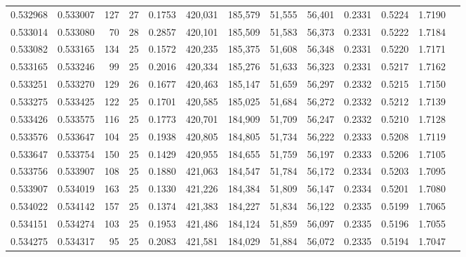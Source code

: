 \begin{tabular}{rrrrrrrrrrrrr}
0.532968 & 0.533007 & 127 &  27 &                                     0.1753 & 420,031 & 185,579 &  51,555 &  56,401 & 0.2331 & 0.5224 & 1.7190 \\
0.533014 & 0.533080 &  70 &  28 &                                     0.2857 & 420,101 & 185,509 &  51,583 &  56,373 & 0.2331 & 0.5222 & 1.7184 \\
0.533082 & 0.533165 & 134 &  25 &                                     0.1572 & 420,235 & 185,375 &  51,608 &  56,348 & 0.2331 & 0.5220 & 1.7171 \\
0.533165 & 0.533246 &  99 &  25 &                                     0.2016 & 420,334 & 185,276 &  51,633 &  56,323 & 0.2331 & 0.5217 & 1.7162 \\
0.533251 & 0.533270 & 129 &  26 &                                     0.1677 & 420,463 & 185,147 &  51,659 &  56,297 & 0.2332 & 0.5215 & 1.7150 \\
0.533275 & 0.533425 & 122 &  25 &                                     0.1701 & 420,585 & 185,025 &  51,684 &  56,272 & 0.2332 & 0.5212 & 1.7139 \\
0.533426 & 0.533575 & 116 &  25 &                                     0.1773 & 420,701 & 184,909 &  51,709 &  56,247 & 0.2332 & 0.5210 & 1.7128 \\
0.533576 & 0.533647 & 104 &  25 &                                     0.1938 & 420,805 & 184,805 &  51,734 &  56,222 & 0.2333 & 0.5208 & 1.7119 \\
0.533647 & 0.533754 & 150 &  25 &                                     0.1429 & 420,955 & 184,655 &  51,759 &  56,197 & 0.2333 & 0.5206 & 1.7105 \\
0.533756 & 0.533907 & 108 &  25 &                                     0.1880 & 421,063 & 184,547 &  51,784 &  56,172 & 0.2334 & 0.5203 & 1.7095 \\
0.533907 & 0.534019 & 163 &  25 &                                     0.1330 & 421,226 & 184,384 &  51,809 &  56,147 & 0.2334 & 0.5201 & 1.7080 \\
0.534022 & 0.534142 & 157 &  25 &                                     0.1374 & 421,383 & 184,227 &  51,834 &  56,122 & 0.2335 & 0.5199 & 1.7065 \\
0.534151 & 0.534274 & 103 &  25 &                                     0.1953 & 421,486 & 184,124 &  51,859 &  56,097 & 0.2335 & 0.5196 & 1.7055 \\
0.534275 & 0.534317 &  95 &  25 &                                     0.2083 & 421,581 & 184,029 &  51,884 &  56,072 & 0.2335 & 0.5194 & 1.7047 \\

\end{tabular}
